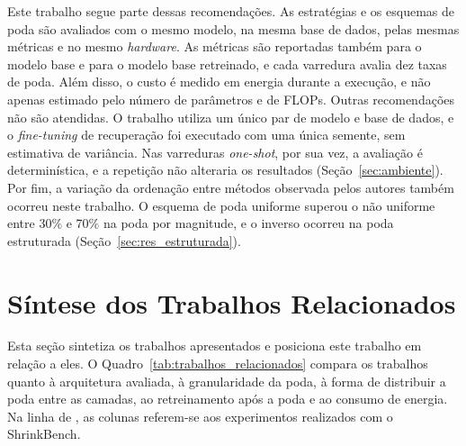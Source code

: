 Este trabalho segue parte dessas recomendações. As estratégias e os esquemas de poda são
avaliados com o mesmo modelo, na mesma base de dados, pelas mesmas métricas e no mesmo
\textit{hardware}. As métricas são reportadas também para o
modelo base e para o modelo base retreinado, e cada varredura avalia dez taxas de poda. Além
disso, o custo é medido em energia durante a execução, e não apenas estimado pelo número de
parâmetros e de FLOPs. Outras recomendações não são atendidas. O trabalho utiliza um único par
de modelo e base de dados, e o \textit{fine-tuning} de recuperação foi executado com uma única
semente, sem estimativa de variância. Nas varreduras
\textit{one-shot}, por sua vez, a avaliação é determinística, e a repetição não alteraria os
resultados (Seção~\ref{sec:ambiente}). Por fim, a variação da ordenação entre métodos observada
pelos autores também ocorreu neste trabalho. O esquema de poda uniforme superou o não uniforme
entre 30\% e 70\% na poda por magnitude, e o inverso ocorreu na poda estruturada
(Seção~\ref{sec:res_estruturada}).

\section{Síntese dos Trabalhos Relacionados}\label{sec:sintese_relacionados}

Esta seção sintetiza os trabalhos apresentados e posiciona este trabalho em relação a eles. O
Quadro~\ref{tab:trabalhos_relacionados} compara os trabalhos quanto à arquitetura avaliada, à
granularidade da poda, à forma de distribuir a poda entre as camadas, ao retreinamento após a
poda e ao consumo de energia. Na linha de , as colunas referem-se aos
experimentos realizados com o ShrinkBench.


